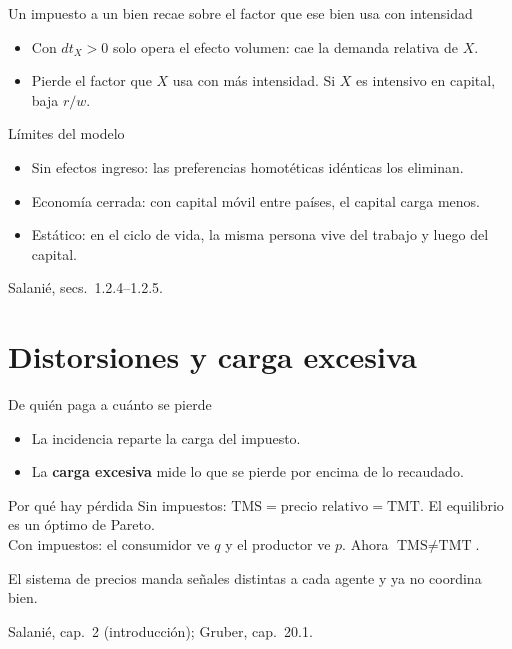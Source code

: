 \documentclass[aspectratio=169,11pt]{beamer}
\newcommand{\fuente}[1]{\par\vfill{\small\color{cGris}#1\par}}
\begin{document}
\begin{frame}{Un impuesto a un bien recae sobre el factor que ese bien usa con intensidad}
  \begin{itemize}
    \item Con $dt_X>0$ solo opera el efecto volumen: cae la demanda relativa de $X$.
    \item Pierde el factor que $X$ usa con más intensidad. Si $X$ es intensivo en capital, baja $r/w$.
  \end{itemize}
  \pause
  \begin{block}{Límites del modelo}
    \begin{itemize}
      \item Sin efectos ingreso: las preferencias homotéticas idénticas los eliminan.
      \item Economía cerrada: con capital móvil entre países, el capital carga menos.
      \item Estático: en el ciclo de vida, la misma persona vive del trabajo y luego del capital.
    \end{itemize}
  \end{block}
  \fuente{Salanié, secs.~1.2.4–1.2.5.}
\end{frame}

\section{Distorsiones y carga excesiva}

\begin{frame}{De quién paga a cuánto se pierde}
  \begin{itemize}
    \item La incidencia reparte la carga del impuesto.
    \item La \textbf{carga excesiva} mide lo que se pierde por encima de lo recaudado.
  \end{itemize}
  \pause
  \begin{block}{Por qué hay pérdida}
    Sin impuestos: $\text{TMS} = \text{precio relativo} = \text{TMT}$. El equilibrio es un óptimo de Pareto.\\[2pt]
    Con impuestos: el consumidor ve $q$ y el productor ve $p$. Ahora $\text{TMS}\neq\text{TMT}$.
  \end{block}
  \pause
  El sistema de precios manda señales distintas a cada agente y ya no coordina bien.
  \fuente{Salanié, cap.~2 (introducción); Gruber, cap.~20.1.}
\end{frame}
\end{document}
